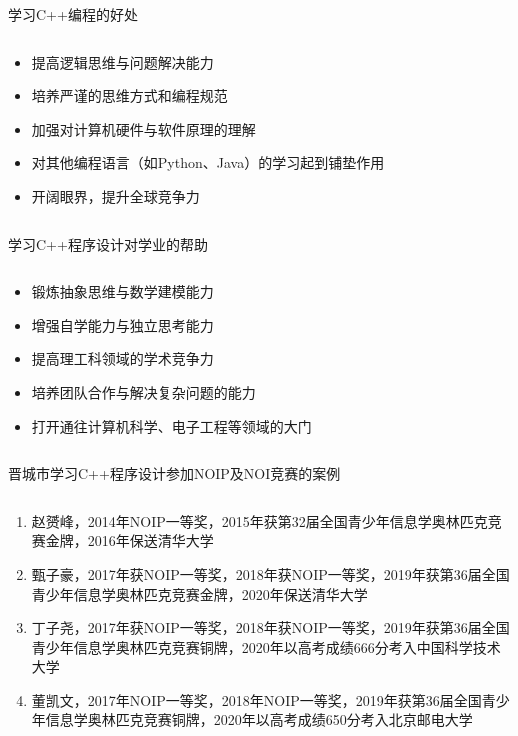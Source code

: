 \documentclass{beamer}
\begin{document}
\begin{frame}{学习C++编程的好处}
\begin{columns}
\begin{spacing}{1.2}
\large
    \begin{itemize}
        \item 提高逻辑思维与问题解决能力
        \item 培养严谨的思维方式和编程规范
        \item 加强对计算机硬件与软件原理的理解
        \item 对其他编程语言（如Python、Java）的学习起到铺垫作用
        \item 开阔眼界，提升全球竞争力
    \end{itemize}
\end{spacing} 
\end{columns}
\end{frame}

\begin{frame}{学习C++程序设计对学业的帮助}
\begin{columns}
\begin{spacing}{1.2}
\large
    \begin{itemize}
        \item 锻炼抽象思维与数学建模能力
        \item 增强自学能力与独立思考能力
        \item 提高理工科领域的学术竞争力
        \item 培养团队合作与解决复杂问题的能力
        \item 打开通往计算机科学、电子工程等领域的大门
    \end{itemize}
\end{spacing} 
\end{columns}
\end{frame}

\begin{frame}[t]{晋城市学习C++程序设计参加NOIP及NOI竞赛的案例}
\begin{columns}
\begin{spacing}{1.4}
\normalsize
    \begin{enumerate}[label={\arabic*.}]
    \item 赵赟峰，2014年NOIP一等奖，2015年获第32届全国青少年信息学奥林匹克竞赛金牌，2016年保送清华大学
	\item 甄子豪，2017年获NOIP一等奖，2018年获NOIP一等奖，2019年获第36届全国青少年信息学奥林匹克竞赛金牌，2020年保送清华大学
	\item 丁子尧，2017年获NOIP一等奖，2018年获NOIP一等奖，2019年获第36届全国青少年信息学奥林匹克竞赛铜牌，2020年以高考成绩666分考入中国科学技术大学
	\item 董凯文，2017年NOIP一等奖，2018年NOIP一等奖，2019年获第36届全国青少年信息学奥林匹克竞赛铜牌，2020年以高考成绩650分考入北京邮电大学
\end{enumerate}
\end{spacing} 
\end{columns}
\end{frame}
\end{document}

